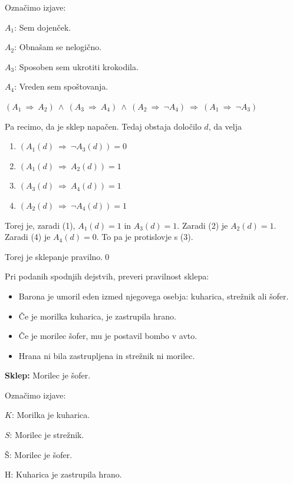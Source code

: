 \documentclass[11pt,paper=b5,footinclude,headinclude]{scrbook} %
\def\inn {{~\wedge~}}
\def\sledi {{~\Rightarrow~}}
\newtheorem{ex}{Vaja\hypertarget{sol:\theex}}[chapter]
\begin{document}
\begin{ex}
\begin{sol}Označimo izjave:

$A_1$: Sem dojenček.

$A_2$: Obnašam se nelogično.

$A_3$: Sposoben sem ukrotiti krokodila.

$A_4$: Vreden sem spoštovanja.

$(A_1\sledi A_2)\inn (A_3\sledi A_4) \inn (A_2\sledi \neg A_4)\sledi (A_1\sledi \neg A_3)$

Pa recimo, da je sklep napačen. Tedaj obstaja določilo $d$, da velja
\begin{enumerate}[(1)]
  \item $(A_1(d)\sledi \neg A_3(d)) = 0$
  \item $(A_1(d)\sledi A_2(d)) = 1$
  \item $(A_3(d)\sledi A_4(d)) = 1$
  \item $(A_2(d)\sledi \neg A_4(d)) = 1$
\end{enumerate}
Torej je, zaradi (1), $A_1(d) = 1$ in $A_3(d) = 1$. Zaradi (2) je $A_2(d) = 1$.
Zaradi (4) je $A_4(d) = 0$. To pa je protislovje s (3).

Torej je sklepanje pravilno.\qed
\end{sol}


%
\begin{ex}Pri podanih spodnjih dejstvih, preveri pravilnost sklepa:
\begin{itemize}
    \item Barona je umoril eden izmed njegovega osebja: kuharica, strežnik ali šofer.
    \item 
    Če je morilka kuharica, je zastrupila hrano.
    \item Če je morilec šofer, mu je postavil bombo v avto.
    \item Hrana ni bila zastrupljena in strežnik ni morilec.
\end{itemize}


\textbf{Sklep:} Morilec je šofer.

\bigskip
\begin{sol}Označimo izjave:

$K$: Morilka je kuharica.

$S$: Morilec je strežnik.

Š: Morilec je šofer.

H: Kuharica je zastrupila hrano.


\end{sol}
\end{ex}
\end{ex}
\end{document}
